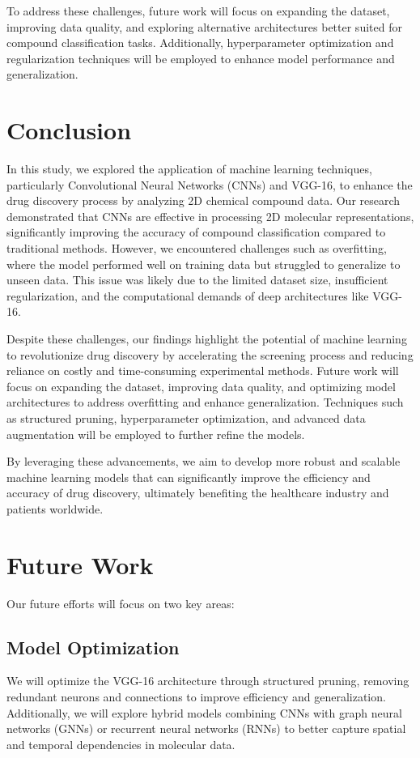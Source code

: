 \documentclass{mcmthesis}
\begin{document}
To address these challenges, future work will focus on expanding the dataset, improving data quality, and exploring alternative architectures better suited for compound classification tasks. Additionally, hyperparameter optimization and regularization techniques will be employed to enhance model performance and generalization.
\section{Conclusion}

In this study, we explored the application of machine learning techniques, particularly Convolutional Neural Networks (CNNs) and VGG-16, to enhance the drug discovery process by analyzing 2D chemical compound data. Our research demonstrated that CNNs are effective in processing 2D molecular representations, significantly improving the accuracy of compound classification compared to traditional methods. However, we encountered challenges such as overfitting, where the model performed well on training data but struggled to generalize to unseen data. This issue was likely due to the limited dataset size, insufficient regularization, and the computational demands of deep architectures like VGG-16.

Despite these challenges, our findings highlight the potential of machine learning to revolutionize drug discovery by accelerating the screening process and reducing reliance on costly and time-consuming experimental methods. Future work will focus on expanding the dataset, improving data quality, and optimizing model architectures to address overfitting and enhance generalization. Techniques such as structured pruning, hyperparameter optimization, and advanced data augmentation will be employed to further refine the models.

By leveraging these advancements, we aim to develop more robust and scalable machine learning models that can significantly improve the efficiency and accuracy of drug discovery, ultimately benefiting the healthcare industry and patients worldwide.
\section{Future Work}

Our future efforts will focus on two key areas:

\subsection{Model Optimization}
We will optimize the VGG-16 architecture through structured pruning, removing redundant neurons and connections to improve efficiency and generalization. Additionally, we will explore hybrid models combining CNNs with graph neural networks (GNNs) or recurrent neural networks (RNNs) to better capture spatial and temporal dependencies in molecular data.
\end{document}

